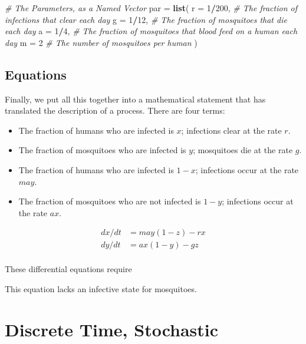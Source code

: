 \documentclass[
]{book}
\newenvironment{Shaded}{\begin{snugshade}}{\end{snugshade}}
\newcommand{\AttributeTok}[1]{\textcolor[rgb]{0.13,0.29,0.53}{#1}}
\newcommand{\CommentTok}[1]{\textcolor[rgb]{0.56,0.35,0.01}{\textit{#1}}}
\newcommand{\DecValTok}[1]{\textcolor[rgb]{0.00,0.00,0.81}{#1}}
\newcommand{\FunctionTok}[1]{\textcolor[rgb]{0.13,0.29,0.53}{\textbf{#1}}}
\newcommand{\NormalTok}[1]{#1}
\newcommand{\OtherTok}[1]{\textcolor[rgb]{0.56,0.35,0.01}{#1}}
\newcommand{\SpecialCharTok}[1]{\textcolor[rgb]{0.81,0.36,0.00}{\textbf{#1}}}
\begin{document}
\begin{Shaded}
\begin{Highlighting}[]
\CommentTok{\# The Parameters, as a Named Vector}
\NormalTok{par }\OtherTok{=} \FunctionTok{list}\NormalTok{(}
  \AttributeTok{r =} \DecValTok{1}\SpecialCharTok{/}\DecValTok{200}\NormalTok{, }\CommentTok{\# The fraction of infections that clear each day}
  \AttributeTok{g =} \DecValTok{1}\SpecialCharTok{/}\DecValTok{12}\NormalTok{,  }\CommentTok{\# The fraction of mosquitoes that die each day}
  \AttributeTok{a =} \DecValTok{1}\SpecialCharTok{/}\DecValTok{4}\NormalTok{,   }\CommentTok{\# The fraction of mosquitoes that blood feed on a human each day}
  \AttributeTok{m =} \DecValTok{2}      \CommentTok{\# The number of mosquitoes per human}
\NormalTok{) }
\end{Highlighting}
\end{Shaded}

\subsection{Equations}\label{equations-1}

Finally, we put all this together into a mathematical statement that has translated the description of a process. There are four terms:

\begin{itemize}
\item
  The fraction of humans who are infected is \(x\); infections clear at the rate \(r.\)
\item
  The fraction of mosquitoes who are infected is \(y\); mosquitoes die at the rate \(g.\)
\item
  The fraction of humans who are infected is \(1-x\); infections occur at the rate \(m a y.\)
\item
  The fraction of mosquitoes who are not infected is \(1-y\); infections occur at the rate \(a x.\)
\end{itemize}

\[ 
\begin{array}{rl}
dx/dt &= may(1-z) - r x\\
dy/dt &= ax(1-y) - g z \\
\end{array}
\]

These differential equations require

This equation lacks an infective state for mosquitoes.

\section{Discrete Time, Stochastic}\label{discrete-time-stochastic}
\end{document}
